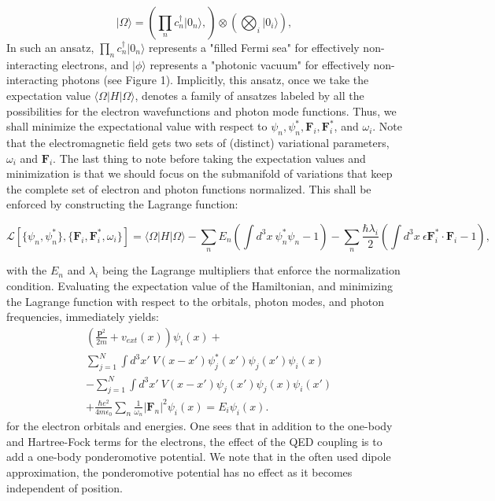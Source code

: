 \documentclass[aps,prl,twocolumn,
	groupedaddress,superscriptaddress,
	amsfonts,amssymb,amsmath,floatfix,
	citeautoscript]{revtex4-1}
\begin{document}
\begin{equation}
|\Omega\rangle = \left( \prod\limits_n c_n^{\dagger}|0_n\rangle,\right) \otimes \left(\bigotimes_i|0_i\rangle\right),
\end{equation}
In such an ansatz, $\prod\limits_n c_n^{\dagger}|0_n\rangle$ represents a "filled Fermi sea" for effectively non-interacting electrons, and $|\phi\rangle$ represents a "photonic vacuum" for effectively non-interacting photons (see Figure 1). Implicitly, this ansatz, once we take the expectation value $\langle \Omega|H|\Omega\rangle$, denotes a family of ansatzes labeled by all the possibilities for the electron wavefunctions and photon mode functions. Thus, we shall minimize the expectational value with respect to $\psi_n, \psi_n^*, \mathbf{F}_i, \mathbf{F}_i^*$, and $\omega_i$. Note that the electromagnetic field gets two sets of (distinct) variational parameters, $\omega_i$ and $\mathbf{F}_i$. The last thing to note before taking the expectation values and minimization is that we should focus on the submanifold of variations that keep the complete set of electron and photon functions normalized. This shall be enforced by constructing the Lagrange function:
\begin{widetext}
\begin{equation}
\mathcal{L}[\{ \psi_n,\psi_n^* \},\{ \mathbf{F}_i,\mathbf{F}_i^*,\omega_i \}] = \langle \Omega |H|\Omega\rangle - \sum_n E_n\left(\int d^3x ~\psi_n^*\psi_n - 1 \right) - \sum_n \frac{\hbar\lambda_i}{2}\left(\int d^3x ~\epsilon\mathbf{F}_i^*\cdot\mathbf{F}_i - 1 \right),
\end{equation}
\end{widetext}
with the $E_n$ and $\lambda_i$ being the Lagrange multipliers that enforce the normalization condition. Evaluating the expectation value of the Hamiltonian, and minimizing the Lagrange function  with respect to the orbitals, photon modes, and photon frequencies, immediately yields:
\begin{align}
&\left(\frac{\mathbf{p}^2}{2m}+v_{ext}(x) \right)\psi_i(x) + \nonumber \\ &\sum\limits_{j=1}^N \int d^3x' ~ V(x-x')\psi^*_j(x')\psi_j(x')\psi_i(x) \nonumber \\ & - \sum\limits_{j=1}^N \int d^3x' ~ V(x-x')\psi_j(x')\psi_j(x)\psi_i(x')  \nonumber \\ &+ \frac{\hbar e^2}{4m\epsilon_0}\sum_n \frac{1}{\omega_n}|\mathbf{F}_n|^2\psi_i(x)   = E_i\psi_i(x).
\end{align}
for the electron orbitals and energies. One sees that in addition to the one-body and Hartree-Fock terms for the electrons, the effect of the QED coupling is to add a one-body ponderomotive potential. We note that in the often used dipole approximation, the ponderomotive potential has no effect as it becomes independent of position.
\end{document}
